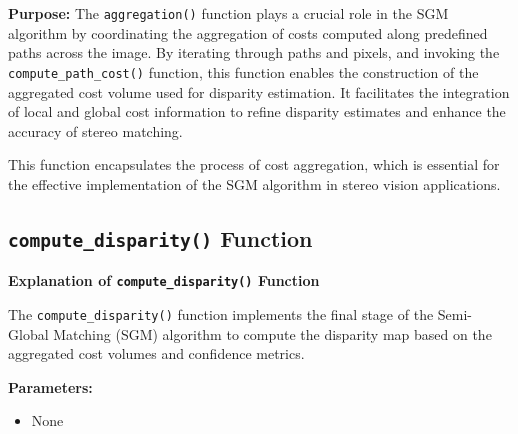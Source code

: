\documentclass{article}
\begin{document}
\textbf{Purpose:}
The \texttt{aggregation()} function plays a crucial role in the SGM algorithm by coordinating the aggregation of costs computed along predefined paths across the image. By iterating through paths and pixels, and invoking the \texttt{compute\_path\_cost()} function, this function enables the construction of the aggregated cost volume used for disparity estimation. It facilitates the integration of local and global cost information to refine disparity estimates and enhance the accuracy of stereo matching.

This function encapsulates the process of cost aggregation, which is essential for the effective implementation of the SGM algorithm in stereo vision applications.


\subsection{\texttt{compute\_disparity()} Function}
\textbf{Explanation of \texttt{compute\_disparity()} Function}

The \texttt{compute\_disparity()} function implements the final stage of the Semi-Global Matching (SGM) algorithm to compute the disparity map based on the aggregated cost volumes and confidence metrics.

\textbf{Parameters:}
\begin{itemize}
    \item None
\end{itemize}
\end{document}
